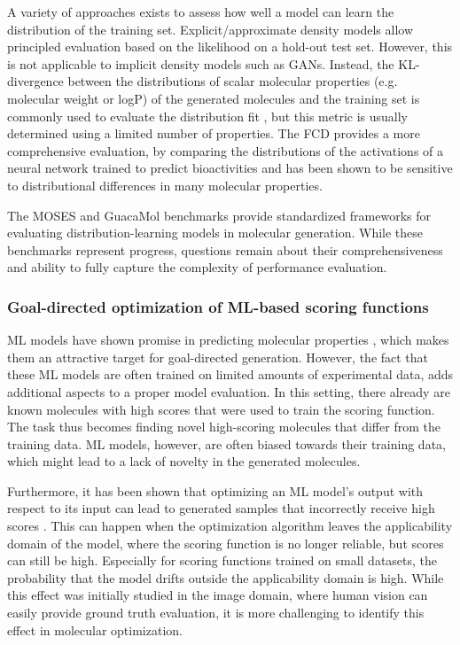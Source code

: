 A variety of approaches exists to assess how well a model can learn the distribution of the training
set. Explicit/approximate density models allow principled evaluation based on the likelihood on a
hold-out test set. However, this is not applicable to implicit density models such as \acp{GAN}.
Instead, the KL-divergence between the distributions of scalar molecular properties (e.g. molecular
weight or logP) of the generated molecules and the training set is commonly used to evaluate the
distribution fit \citep{brownGuacaMolBenchmarkingModels2019,polykovskiyMolecularSetsMOSES2020}, but
this metric is usually determined using a limited number of properties. The \ac{FCD}
\citep{preuerFrechetChemNetDistance2018} provides a more comprehensive evaluation, by comparing the
distributions of the activations of a neural network trained to predict bioactivities and has been
shown to be sensitive to distributional differences in many molecular properties.

The MOSES \citep{polykovskiyMolecularSetsMOSES2020} and GuacaMol
\citep{brownGuacaMolBenchmarkingModels2019} benchmarks provide standardized frameworks for
evaluating distribution-learning models in molecular generation. While these benchmarks represent
progress, questions remain about their comprehensiveness and ability to fully capture the
complexity of performance evaluation.

\subsubsection{Goal-directed optimization of ML-based scoring functions}
\ac{ML} models have shown promise in predicting molecular properties
\citep{mayrDeepToxToxicityPrediction2016,klambauerMachineLearningDrug2019,vamathevanApplicationsMachineLearning2019,chenRiseDeepLearning2018,stokesDeepLearningApproach2020},
which makes them an attractive target for goal-directed generation. However, the fact that these
\ac{ML} models are often trained on limited amounts of experimental data, adds additional aspects
to a proper model evaluation. In this setting, there already are known molecules with high scores
that were used to train the scoring function. The task thus becomes finding novel
high-scoring molecules that differ from the training data. \ac{ML} models, however, are
often biased towards their training data, which might lead to a lack of novelty in the generated
molecules.

Furthermore, it has been shown that optimizing an \ac{ML} model's output with respect to its input
can lead to generated samples that incorrectly receive high scores
\citep{szegedyIntriguingPropertiesNeural2014,goodfellowExplainingHarnessingAdversarial2015}. This
can happen when the optimization algorithm leaves the applicability domain of the model, where the
scoring function is no longer reliable, but scores can still be high. Especially for scoring
functions trained on small datasets, the probability that the model drifts outside the applicability
domain is high. While this effect was initially studied in the image domain, where human vision can
easily provide ground truth evaluation, it is more challenging to identify this effect in molecular
optimization.

